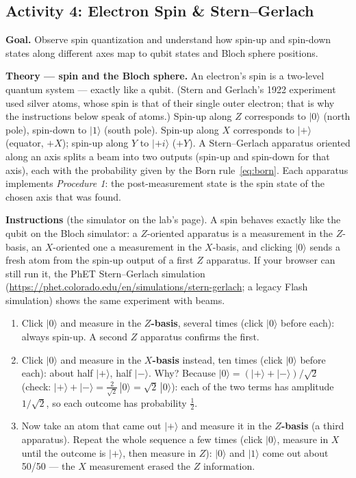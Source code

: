 \documentclass[a4paper,11pt]{article}
\newcommand{\keepspace}[1]{\par\vspace{0pt plus #1}\penalty-300\vspace{0pt plus -#1}}
\providecommand{\ket}[1]{|{#1}\rangle}
\begin{document}
\keepspace{8\baselineskip}
\subsection{Activity 4: Electron Spin \& Stern--Gerlach}

\begin{studentbox}
\textbf{Goal.} Observe spin quantization and understand how spin-up and spin-down states
along different axes map to qubit states and Bloch sphere positions.

\medskip
\textbf{Theory --- spin and the Bloch sphere.} An electron's spin is a two-level quantum
system --- exactly like a qubit. (Stern and Gerlach's 1922 experiment used silver atoms,
whose spin is that of their single outer electron; that is why the instructions below speak
of atoms.) Spin-up along $Z$ corresponds to $\ket{0}$ (north pole),
spin-down to $\ket{1}$ (south pole). Spin-up along $X$ corresponds to $\ket{+}$ (equator,
$+X$); spin-up along $Y$ to $\ket{+i}$ ($+Y$). A Stern--Gerlach apparatus oriented along
an axis splits a beam into two outputs (spin-up and spin-down for that axis), each with
the probability given by the Born rule~\eqref{eq:born}. Each apparatus implements
\emph{Procedure 1}: the post-measurement state is the spin state of the chosen axis that
was found.

\medskip
\textbf{Instructions} (the simulator on the lab's page). A spin behaves exactly like the
qubit on the Bloch simulator: a $Z$-oriented apparatus is a measurement in the $Z$-basis,
an $X$-oriented one a measurement in the $X$-basis, and clicking $\ket{0}$ sends a fresh
atom from the spin-up output of a first $Z$ apparatus. If your browser can still run it,
the PhET Stern--Gerlach simulation (\url{https://phet.colorado.edu/en/simulations/stern-gerlach};
a legacy Flash simulation) shows the same experiment with beams.
\begin{enumerate}
    \item Click $\ket{0}$ and measure in the \textbf{$Z$-basis}, several times (click
          $\ket{0}$ before each): always spin-up. A second $Z$ apparatus confirms the first.
    \item Click $\ket{0}$ and measure in the \textbf{$X$-basis} instead, ten times (click
          $\ket{0}$ before each): about half $\ket{+}$, half $\ket{-}$. Why? Because
          $\ket{0} = (\ket{+} + \ket{-})/\sqrt 2$ (check: $\ket{+} + \ket{-} = \tfrac{2}{\sqrt 2}\,\ket{0}
          = \sqrt 2\,\ket{0}$): each of the two terms has amplitude $1/\sqrt 2$, so each outcome
          has probability $\tfrac12$.
    \item Now take an atom that came out $\ket{+}$ and measure it in the \textbf{$Z$-basis}
          (a third apparatus). Repeat the whole sequence a few times (click $\ket{0}$,
          measure in $X$ until the outcome is $\ket{+}$, then measure in $Z$): $\ket{0}$ and
          $\ket{1}$ come out about 50/50 --- the $X$ measurement erased the $Z$ information.
\end{enumerate}


\end{studentbox}
\end{document}
